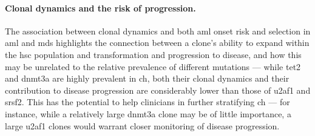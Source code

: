 \paragraph{Clonal dynamics and the risk of progression.} The association between clonal dynamics and both \ac{aml} onset risk and selection in \ac{aml} and \ac{mds} highlights the connection between a clone's ability to expand within the \ac{hsc} population and transformation and progression to disease, and how this may be unrelated to the relative prevalence of different mutations --- while \ac{tet2} and \ac{dnmt3a} are highly prevalent in \ac{ch}, both their clonal dynamics and their contribution to disease progression are considerably lower than those of \ac{u2af1} and \ac{srsf2}. This has the potential to help clinicians in further stratifying \ac{ch} --- for instance, while a relatively large \ac{dnmt3a} clone may be of little importance, a large \ac{u2af1} clones would warrant closer monitoring of disease progression.

